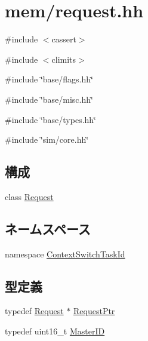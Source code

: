 \hypertarget{request_8hh}{
\section{mem/request.hh}
\label{request_8hh}
}
{\ttfamily \#include $<$cassert$>$}\par
{\ttfamily \#include $<$climits$>$}\par
{\ttfamily \#include \char`\"{}base/flags.hh\char`\"{}}\par
{\ttfamily \#include \char`\"{}base/misc.hh\char`\"{}}\par
{\ttfamily \#include \char`\"{}base/types.hh\char`\"{}}\par
{\ttfamily \#include \char`\"{}sim/core.hh\char`\"{}}\par
\subsection*{構成}
\begin{DoxyCompactItemize}
\item 
class \hyperlink{classRequest}{Request}
\end{DoxyCompactItemize}
\subsection*{ネームスペース}
\begin{DoxyCompactItemize}
\item 
namespace \hyperlink{namespaceContextSwitchTaskId}{ContextSwitchTaskId}
\end{DoxyCompactItemize}
\subsection*{型定義}
\begin{DoxyCompactItemize}
\item 
typedef \hyperlink{classRequest}{Request} $\ast$ \hyperlink{request_8hh_a205ab3644529411056be77e9f2abab27}{RequestPtr}
\item 
typedef uint16\_\-t \hyperlink{request_8hh_ac366b729262fd8e7cbd3283da6f775cf}{MasterID}
\end{DoxyCompactItemize}
